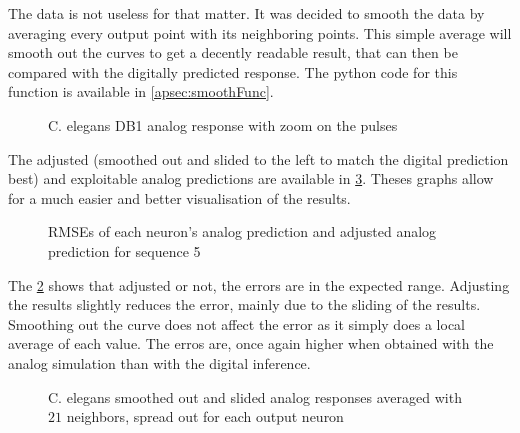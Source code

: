 The data is not useless for that matter. It was decided to smooth the data by averaging every output point with its neighboring points. This simple average will smooth out the curves to get a decently readable result, that can then be compared with the digitally predicted response. The python code for this function is available in \cref{apsec:smoothFunc}.

\begin{figure}[H]
  \centering
  
  \caption{\acs{C. elegans} DB1 analog response with zoom on the pulses}
  \label{graph:zoom5Celegans}
\end{figure}

The adjusted (smoothed out and slided to the left to match the digital prediction best) and exploitable analog predictions are available in \cref{graph:smooth5Celegans}. Theses graphs allow for a much easier and better visualisation of the results.

\begin{figure}[H]
  \centering
  
  \caption{\acp{RMSE} of each neuron's analog prediction and adjusted analog prediction for sequence 5}
  \label{bar:rmse5}
\end{figure}

The \cref{bar:rmse5} shows that adjusted or not, the errors are in the expected range. Adjusting the results slightly reduces the error, mainly due to the sliding of the results. Smoothing out the curve does not affect the error as it simply does a local average of each value. The erros are, once again higher when obtained with the analog simulation than with the digital inference.

\begin{figure}[H]
  \centering
  \begin{minipage}{\columnwidth}
    \hfill
  \end{minipage}
  \begin{minipage}{\columnwidth}
    \hfill
  \end{minipage}
  \caption{\ac{C. elegans} smoothed out and slided analog responses averaged with $21$ neighbors, spread out for each output neuron}
  \label{graph:smooth5Celegans}
\end{figure}

